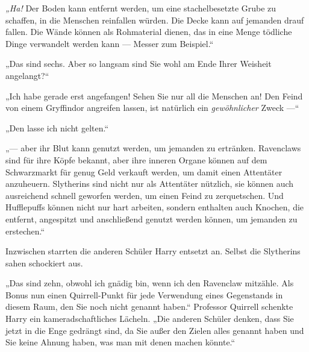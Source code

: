 \emph{„Ha!} Der Boden kann entfernt werden, um eine stachelbesetzte Grube zu schaffen, in die Menschen reinfallen würden. Die Decke kann auf jemanden drauf fallen. Die Wände können als Rohmaterial dienen, das in eine Menge tödliche Dinge verwandelt werden kann — Messer zum Beispiel.“

„Das sind sechs. Aber so langsam sind Sie wohl am Ende Ihrer Weisheit angelangt?“

„Ich habe gerade erst angefangen! Sehen Sie nur all die Menschen an! Den Feind von einem Gryffindor angreifen lassen, ist natürlich ein \emph{gewöhnlicher} Zweck —“

„Den lasse ich nicht gelten.“

„— aber ihr Blut kann genutzt werden, um jemanden zu ertränken. Ravenclaws sind für ihre Köpfe bekannt, aber ihre inneren Organe können auf dem Schwarzmarkt für genug Geld verkauft werden, um damit einen Attentäter anzuheuern. Slytherins sind nicht nur als Attentäter nützlich, sie können auch ausreichend schnell geworfen werden, um einen Feind zu zerquetschen. Und Hufflepuffs können nicht nur hart arbeiten, sondern enthalten auch Knochen, die entfernt, angespitzt und anschließend genutzt werden können, um jemanden zu erstechen.“

Inzwischen starrten die anderen Schüler Harry entsetzt an. Selbst die Slytherins sahen schockiert aus.

„Das sind zehn, obwohl ich gnädig bin, wenn ich den Ravenclaw mitzähle. Als Bonus nun einen Quirrell-Punkt für jede Verwendung eines Gegenstands in diesem Raum, den Sie noch nicht genannt haben.“ Professor Quirrell schenkte Harry ein kameradschaftliches Lächeln.
„Die anderen Schüler denken, dass Sie jetzt in die Enge gedrängt sind, da Sie außer den Zielen alles genannt haben und Sie keine Ahnung haben, was man mit denen machen könnte.“

